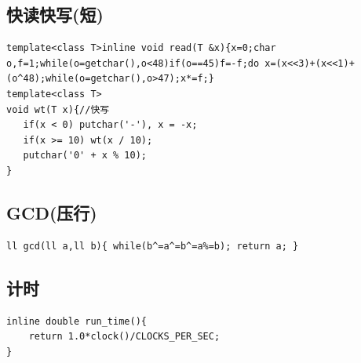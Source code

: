 \documentclass[a4]{ctexart}
\begin{document}
\subsection{快读快写(短)}
\begin{lstlisting}
template<class T>inline void read(T &x){x=0;char o,f=1;while(o=getchar(),o<48)if(o==45)f=-f;do x=(x<<3)+(x<<1)+(o^48);while(o=getchar(),o>47);x*=f;}
template<class T>
void wt(T x){//快写
   if(x < 0) putchar('-'), x = -x;
   if(x >= 10) wt(x / 10);
   putchar('0' + x % 10);
}
\end{lstlisting}

\subsection{GCD(压行)}
\begin{lstlisting}
ll gcd(ll a,ll b){ while(b^=a^=b^=a%=b); return a; }
\end{lstlisting}

\subsection{计时}
\begin{lstlisting}
inline double run_time(){
    return 1.0*clock()/CLOCKS_PER_SEC;
}
\end{lstlisting}
\end{document}
